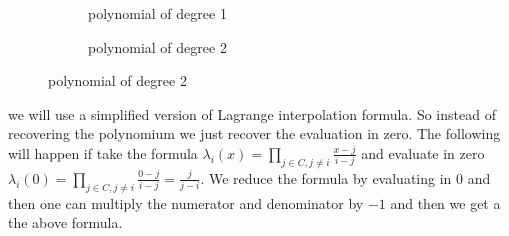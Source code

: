 \begin{figure}[H]
    \centering
    \captionsetup[subfigure]{labelformat=empty}
    \begin{subfigure}[b]{0.3\textwidth}
        \caption{polynomial of degree 1}
    \end{subfigure}
    \qquad %
    \qquad %
    \qquad %
    \qquad %
    \begin{subfigure}[b]{0.3\textwidth}
        \caption{polynomial of degree 2}
    \end{subfigure}
\end{figure}


 we will use a simplified version of Lagrange interpolation formula. So instead of recovering the polynomium we just recover the evaluation in zero. The following will happen if take the formula \begin{math} \lambda_i(x)=\prod\limits_{j\in C,j\neq i}  \frac{x-j}{i-j} \end{math} and evaluate in zero \begin{math} \lambda_i(0)=\prod\limits_{j\in C,j\neq i}  \frac{0-j}{i-j} = \frac{j}{j-i} \end{math}. We reduce the formula by evaluating in $0$ and then one can multiply the numerator and denominator by $-1$ and then we get a the above formula.


